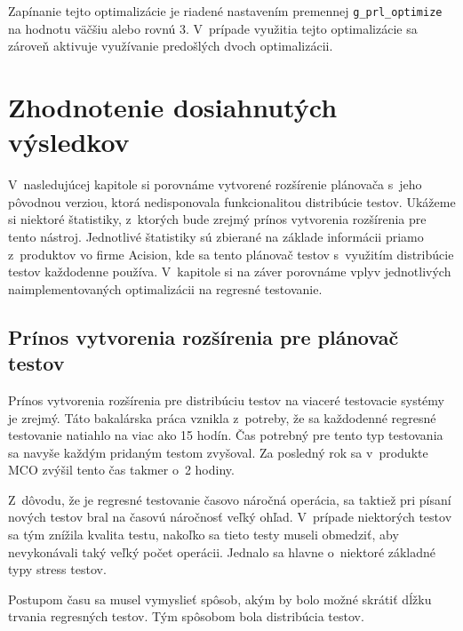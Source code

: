 Zapínanie tejto optimalizácie je riadené nastavením premennej 
\texttt{g\_prl\_optimize} na hodnotu väčšiu alebo rovnú 3. 
V~prípade využitia tejto optimalizácie sa zároveň aktivuje využívanie 
predošlých dvoch optimalizácii.



%
%
\chapter{Zhodnotenie dosiahnutých výsledkov}
\label{kapitola:zhodnotenie_vysledkov}
V~nasledujúcej kapitole si porovnáme vytvorené rozšírenie plánovača s~jeho
pôvodnou verziou, ktorá nedisponovala funkcionalitou distribúcie testov.
Ukážeme si niektoré štatistiky, z~ktorých bude zrejmý prínos vytvorenia
rozšírenia pre tento nástroj. Jednotlivé štatistiky sú zbierané na základe
informácii priamo z~produktov vo firme Acision, kde sa tento plánovač testov
s~využitím distribúcie testov každodenne používa. V~kapitole si na záver 
porovnáme vplyv jednotlivých naimplementovaných optimalizácii na regresné
testovanie. 


\section{Prínos vytvorenia rozšírenia pre plánovač testov}
\label{sekcia:prinos_pouzitia}
Prínos vytvorenia rozšírenia pre distribúciu testov na viaceré testovacie 
systémy je zrejmý. Táto bakalárska práca vznikla z~potreby, že sa každodenné
regresné testovanie natiahlo na viac ako 15 hodín. Čas potrebný pre tento
typ testovania sa navyše každým pridaným testom zvyšoval. 
Za posledný rok sa v~produkte MCO zvýšil tento čas takmer o~2 hodiny.

Z~dôvodu, že je regresné testovanie časovo náročná operácia, sa taktiež 
pri písaní nových testov bral na časovú náročnosť veľký ohľad.
V~prípade niektorých testov sa tým znížila kvalita testu, nakoľko sa tieto
testy museli obmedziť, aby nevykonávali taký veľký počet operácii.
Jednalo sa hlavne o~niektoré základné typy stress testov.

Postupom času sa musel vymyslieť spôsob, akým by bolo možné skrátiť 
dĺžku trvania regresných testov. Tým spôsobom bola distribúcia testov.

